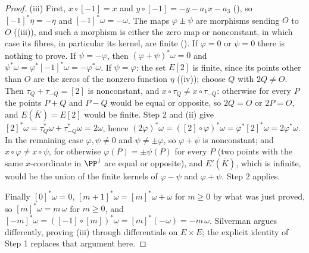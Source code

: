 \begin{proof}
(iii) First, $x\circ[-1]=x$ and $y\circ[-1]=-y-a_1x-a_3$ (), so $[-1]^*\eta=-\eta$ and $[-1]^*\omega=-\omega$. The maps $\varphi\pm\psi$ are
morphisms sending $O$ to $O$ ((iii)), and such a morphism is either the zero map or nonconstant, in which case its fibres, in particular its
kernel, are finite (). If $\varphi=0$ or $\psi=0$ there is nothing to prove. If $\psi=-\varphi$, then $(\varphi+\psi)^*\omega=0$ and
$\psi^*\omega=\varphi^*[-1]^*\omega=-\varphi^*\omega$. If $\psi=\varphi$: the set $E[2]$ is finite, since its points other than $O$ are the zeros of the nonzero function $\eta$
((iv)); choose $Q$ with $2Q\ne O$. Then $\tau_Q+\tau_{-Q}=[2]$ is nonconstant, and $x\circ\tau_Q\ne x\circ\tau_{-Q}$: otherwise for every
$P$ the points $P+Q$ and $P-Q$ would be equal or opposite, so $2Q=O$ or $2P=O$, and $E(\bar K)=E[2]$ would be finite. Step 2 and (ii) give
$[2]^*\omega=\tau_Q^*\omega+\tau_{-Q}^*\omega=2\omega$, hence $(2\varphi)^*\omega=([2]\circ\varphi)^*\omega=\varphi^*[2]^*\omega=2\varphi^*\omega$. In the remaining case
$\varphi,\psi\ne0$ and $\psi\ne\pm\varphi$, so $\varphi+\psi$ is nonconstant; and $x\circ\varphi\ne x\circ\psi$, for otherwise $\varphi(P)=\pm\psi(P)$ for every $P$ (two points
with the same $x$-coordinate in $\PP^1$ are equal or opposite), and $E'(\bar K)$, which is infinite, would be the union of the finite kernels of $\varphi-\psi$ and
$\varphi+\psi$. Step 2 applies.

Finally $[0]^*\omega=0$, $[m+1]^*\omega=[m]^*\omega+\omega$ for $m\ge0$ by what was just proved, so $[m]^*\omega=m\,\omega$ for $m\ge0$, and
$[-m]^*\omega=([-1]\circ[m])^*\omega=[m]^*(-\omega)=-m\,\omega$. Silverman \cite[Section III.5]{SilvermanAEC} argues differently, proving (iii) through differentials on
$E\times E$; the explicit identity of Step 1 replaces that argument here.
\end{proof}

